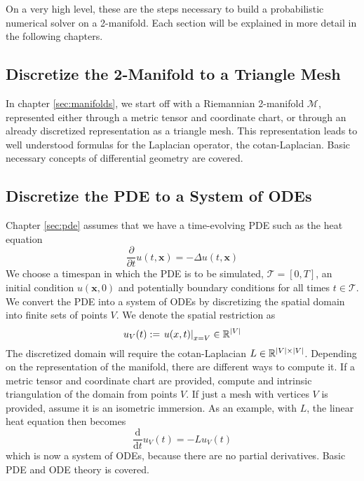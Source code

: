 \ifdefined\COMPILINGFROMMAIN
\else
    
    
\fi

\noindent
On a very high level, these are the steps necessary to build a probabilistic numerical solver on a 2-manifold. Each section will be explained in more detail in the following chapters.

\subsection*{Discretize the 2-Manifold to a Triangle Mesh}
In chapter \ref{sec:manifolds}, we start off with a Riemannian 2-manifold $\mathcal{M}$, represented either through a metric tensor and coordinate chart, or through an already discretized representation as a triangle mesh. This representation leads to well understood formulas for the Laplacian operator, the cotan-Laplacian. Basic necessary concepts of differential geometry are covered.
\subsection*{Discretize the PDE to a System of ODEs}
Chapter \ref{sec:pde} assumes that we have a time-evolving PDE such as the heat equation $$\frac{\partial}{\partial t}u(t,\mathbf{x}) = -\Delta u(t,\mathbf{x})$$ We choose a timespan in which the PDE is to be simulated, $\mathcal{T} = [0, T]$, an initial condition $u(\mathbf{x}, 0)$ and potentially boundary conditions for all times $t\in \mathcal{T}$. We convert the PDE into a system of ODEs by discretizing the spatial domain into finite sets of points $V$. We denote the spatial restriction as $$u_V(t) := \left . u(x,t)\right|_{x=V} \in \mathbb{R}^{|V|}$$ The discretized domain will require the cotan-Laplacian $L \in \mathbb{R}^{|V|\times |V|}$. Depending on the representation of the manifold, there are different ways to compute it.  If a metric tensor and coordinate chart are provided, compute and intrinsic triangulation of the domain from points $V$. If just a mesh with vertices $V$ is provided, assume it is an isometric immersion. As an example, with $L$, the linear heat equation then becomes $$\frac{\text{d}}{\text{d} t}u_V(t) = -Lu_V(t)$$ which is now a system of ODEs, because there are no partial derivatives. Basic PDE and ODE theory is covered.
